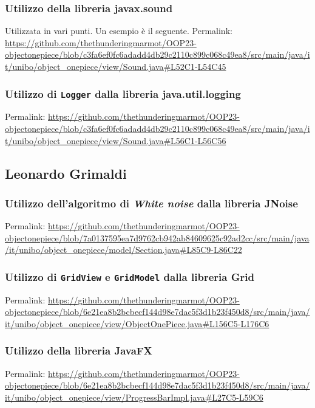 \documentclass[a4paper,12pt]{report}
\begin{document}
\subsubsection{Utilizzo della libreria javax.sound}
Utilizzata in vari punti. Un esempio è il seguente. 
Permalink: \url{https://github.com/thethunderingmarmot/OOP23-objectonepiece/blob/c3fa6ef0fc6adadd4db29c2110c899c068c49ea8/src/main/java/it/unibo/object_onepiece/view/Sound.java#L52C1-L54C45}

\subsubsection{Utilizzo di \texttt{Logger} dalla libreria java.util.logging}
Permalink: \url{https://github.com/thethunderingmarmot/OOP23-objectonepiece/blob/c3fa6ef0fc6adadd4db29c2110c899c068c49ea8/src/main/java/it/unibo/object_onepiece/view/Sound.java#L56C1-L56C56}

\subsection*{Leonardo Grimaldi}

\subsubsection{Utilizzo dell'algoritmo di \textit{White noise} dalla libreria JNoise}

Permalink: \url{https://github.com/thethunderingmarmot/OOP23-objectonepiece/blob/7a0137595ea7d9762cb942ab84609625c92ad2cc/src/main/java/it/unibo/object_onepiece/model/Section.java#L85C9-L86C22}

\subsubsection{Utilizzo di \texttt{GridView} e \texttt{GridModel} dalla libreria Grid}

Permalink: \url{https://github.com/thethunderingmarmot/OOP23-objectonepiece/blob/6e21ea8b2bcbecf144d98e7dac5f3d1b23f450d8/src/main/java/it/unibo/object_onepiece/view/ObjectOnePiece.java#L156C5-L176C6}

\subsubsection{Utilizzo della libreria JavaFX}

Permalink: \url{https://github.com/thethunderingmarmot/OOP23-objectonepiece/blob/6e21ea8b2bcbecf144d98e7dac5f3d1b23f450d8/src/main/java/it/unibo/object_onepiece/view/ProgressBarImpl.java#L27C5-L59C6}
\end{document}
